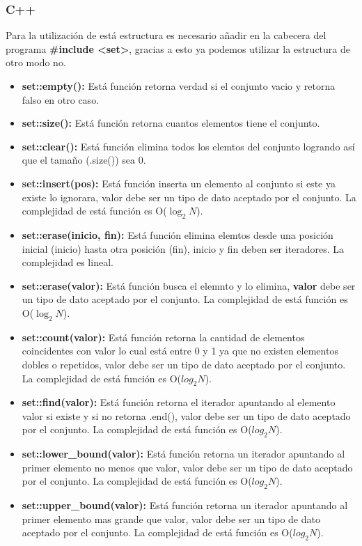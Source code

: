 \subsubsection{C++}

Para la utilización de está estructura es necesario añadir en la cabecera del programa \textbf{\#include <set>}, gracias a esto ya podemos utilizar la estructura de otro modo no.

\begin{itemize}
	\item \textbf{set::empty():} Está función retorna verdad si el conjunto vacio y retorna falso en otro caso.
	\item \textbf{set::size():} Está función retorna cuantos elementos tiene el conjunto.
	\item \textbf{set::clear():} Está función elimina todos los elemtos del conjunto logrando así que el
	tamaño (.size()) sea 0.
	\item \textbf{set::insert(pos):} Está función inserta un elemento al conjunto si este ya existe lo ignorara,
valor debe ser un tipo de dato aceptado por el conjunto. La complejidad de
está función es O($\log_2 N$).
	\item \textbf{set::erase(inicio, fin):} Está función elimina elemtos desde una posición inicial (inicio) hasta otra
posición (fin), inicio y fin deben ser iteradores. La complejidad es lineal.
	\item \textbf{set::erase(valor):} Está función busca el elemnto y lo elimina, \textbf{valor} debe ser un tipo de dato
aceptado por el conjunto. La complejidad de está función es O($\log_2 N$).
	\item \textbf{set::count(valor):} Está función retorna la cantidad de elementos coincidentes con valor
	lo cual está entre 0 y 1 ya que no existen elementos dobles o repetidos,
valor debe ser un tipo de dato aceptado por el conjunto. La complejidad
de está función es O($log_2 N$).
	\item \textbf{set::find(valor):} Está función retorna el iterador apuntando al elemento valor si existe y si
no retorna .end(), valor debe ser un tipo de dato aceptado por el conjunto.
La complejidad de está función es O($log_2 N$).
	\item \textbf{set::lower\_bound(valor):} Está función retorna un iterador apuntando al primer elemento no menos
que valor, valor debe ser un tipo de dato aceptado por el conjunto. La
complejidad de está función es O($log_2 N$).
	\item \textbf{set::upper\_bound(valor):} Está función retorna un iterador apuntando al primer elemento mas
grande que valor, valor debe ser un tipo de dato aceptado por el conjunto. La complejidad de está función es O($log_2 N$).
\end{itemize}

